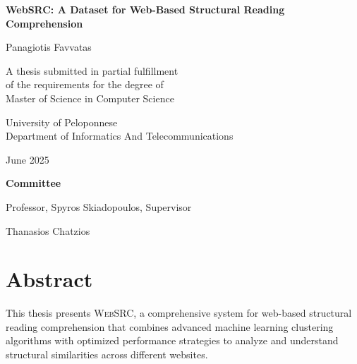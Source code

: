 \documentclass[12pt,a4paper,oneside]{book}
\newcommand{\name}{\textsc{WebSRC}}
\begin{document}
\begin{titlepage}
\centering

\vspace*{1cm}
\vspace{1cm}

{\huge\bfseries WebSRC: A Dataset for Web-Based Structural Reading Comprehension\par}
\vspace{2cm}

{\Large Panagiotis Favvatas\par}
\vspace{1.5cm}

{\large A thesis submitted in partial fulfillment\\
of the requirements for the degree of\\
Master of Science in Computer Science\par}
\vspace{2cm}

{\large University of Peloponnese\\
Department of Informatics And Telecommunications\par}
\vspace{1cm}

{\large June 2025\par}

\vspace{1.5cm}

{\large \textbf{Committee}\par}
\vspace{0.5cm}
{\normalsize Professor, Spyros Skiadopoulos, Supervisor\par}
\vspace{0.3cm}
{\normalsize Thanasios Chatzios\par}

\end{titlepage}

\frontmatter
\pagestyle{plain}

\chapter*{Abstract}

This thesis presents {\name}, a comprehensive system for web-based structural reading comprehension that combines advanced machine learning clustering algorithms with optimized performance strategies to analyze and understand structural similarities across different websites.
\end{document}
